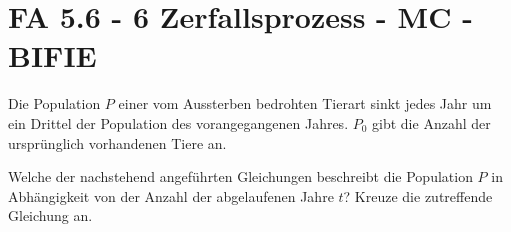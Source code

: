 \section{FA 5.6 - 6 Zerfallsprozess - MC - BIFIE}

\begin{beispiel}[FA 5.6]{1} %
Die Population $P$ einer vom Aussterben bedrohten Tierart sinkt jedes Jahr um ein Drittel der Population des vorangegangenen Jahres. $P_0$ gibt die Anzahl der ursprünglich vorhandenen Tiere an.

\leer

Welche der nachstehend angeführten Gleichungen beschreibt die Population $P$ in Abhängigkeit von der Anzahl der abgelaufenen Jahre $t$? Kreuze die zutreffende Gleichung an.

\end{beispiel}